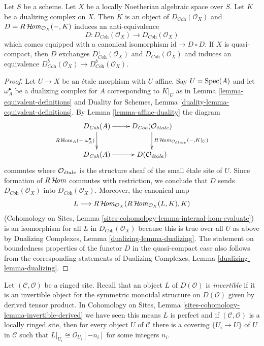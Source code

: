 \begin{lemma}
\label{lemma-dualizing-spaces}
Let $S$ be a scheme. Let $X$ be a locally Noetherian algebraic space over $S$.
Let $K$ be a dualizing complex on $X$.
Then $K$ is an object of $D_{\textit{Coh}}(\mathcal{O}_X)$
and $D = R\mathop{\mathcal{H}\!\mathit{om}}\nolimits_{\mathcal{O}_X}(-, K)$ induces an anti-equivalence
$$
D :
D_{\textit{Coh}}(\mathcal{O}_X)
\longrightarrow
D_{\textit{Coh}}(\mathcal{O}_X)
$$
which comes equipped with a canonical isomorphism
$\text{id} \to D \circ D$. If $X$ is quasi-compact, then
$D$ exchanges $D^+_{\textit{Coh}}(\mathcal{O}_X)$ and
$D^-_{\textit{Coh}}(\mathcal{O}_X)$ and induces an equivalence
$D^b_{\textit{Coh}}(\mathcal{O}_X) \to D^b_{\textit{Coh}}(\mathcal{O}_X)$.
\end{lemma}

\begin{proof}
Let $U \to X$ be an \'etale morphism with $U$ affine. Say $U = \mathop{\mathrm{Spec}}(A)$ and
let $\omega_A^\bullet$ be a dualizing complex for $A$ corresponding to $K|_U$
as in Lemma \ref{lemma-equivalent-definitions} and
Duality for Schemes, Lemma \ref{duality-lemma-equivalent-definitions}.
By Lemma \ref{lemma-affine-duality} the diagram
$$
\xymatrix{
D_{\textit{Coh}}(A) \ar[r] \ar[d]_{R\Hom_A(-, \omega_A^\bullet)} &
D_{\textit{Coh}}(\mathcal{O}_\etale)
\ar[d]^{R\SheafHom_{\mathcal{O}_\etale}(-, K|_U)} \\
D_{\textit{Coh}}(A) \ar[r] &
D(\mathcal{O}_\etale)
}
$$
commutes where $\mathcal{O}_{\acute{e}tale}$ is the structure sheaf of the
small \'etale site of $U$. Since formation of $R\mathop{\mathcal{H}\!\mathit{om}}\nolimits$ commutes
with restriction, we conclude that $D$ sends
$D_{\textit{Coh}}(\mathcal{O}_X)$ into
$D_{\textit{Coh}}(\mathcal{O}_X)$. Moreover, the canonical map
$$
L \longrightarrow
R\mathop{\mathcal{H}\!\mathit{om}}\nolimits_{\mathcal{O}_X}(R\mathop{\mathcal{H}\!\mathit{om}}\nolimits_{\mathcal{O}_X}(L, K), K)
$$
(Cohomology on Sites, Lemma \ref{sites-cohomology-lemma-internal-hom-evaluate})
is an isomorphism for all $L$ in $D_{\textit{Coh}}(\mathcal{O}_X)$
because this is true over all $U$ as above by
Dualizing Complexes, Lemma \ref{dualizing-lemma-dualizing}.
The statement on boundedness properties of the functor $D$
in the quasi-compact case also follows from the corresponding
statements of Dualizing Complexes, Lemma \ref{dualizing-lemma-dualizing}.
\end{proof}

\noindent
Let $(\mathcal{C}, \mathcal{O})$ be a ringed site. Recall
that an object $L$ of $D(\mathcal{O})$ is {\it invertible}
if it is an invertible object for the symmetric monoidal
structure on $D(\mathcal{O})$ given by derived tensor product. In
Cohomology on Sites, Lemma \ref{sites-cohomology-lemma-invertible-derived}
we have seen this means $L$ is perfect and if $(\mathcal{C}, \mathcal{O})$
is a locally ringed site, then for every object $U$ of $\mathcal{C}$
there is a covering $\{U_i \to U\}$ of $U$ in $\mathcal{C}$
such that $L|_{U_i} \cong \mathcal{O}_{U_i}[-n_i]$
for some integers $n_i$.

